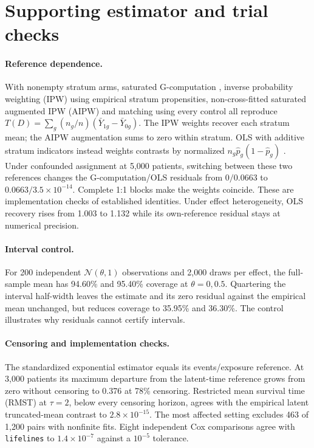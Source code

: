 \section{Supporting estimator and trial checks}
\label{analysis:app:matrix}\label{analysis:sec:matrix}

\paragraph{Reference dependence.}
With nonempty stratum arms, saturated G-computation \citep{robins1986}, inverse
probability weighting (IPW) using empirical stratum propensities,
non-cross-fitted saturated augmented IPW (AIPW) and
matching using every control all reproduce
$T(D)=\sum_g(n_g/n)(\bar Y_{1g}-\bar Y_{0g})$. The IPW weights recover each
stratum mean; the AIPW augmentation sums to zero within stratum. OLS with
additive stratum indicators instead weights contrasts by normalized
$n_g\hat p_g(1-\hat p_g)$ \citep{angrist1998,frisch1933}. Under confounded
assignment at 5{,}000 patients, switching between these two references changes
the G-computation/OLS residuals from $0/0.0663$ to $0.0663/3.5\times10^{-14}$.
Complete 1:1 blocks make the weights coincide. These are implementation checks
of established identities. Under effect heterogeneity, OLS recovery rises
from 1.003 to 1.132 while its own-reference residual stays at numerical precision.

\paragraph{Interval control.}
For 200 independent $\mathcal N(\theta,1)$ observations and 2{,}000 draws per
effect, the full-sample mean has 94.60\% and 95.40\% coverage at
$\theta=0,0.5$. Quartering the interval half-width leaves the estimate and its
zero residual against the empirical mean unchanged, but reduces coverage to
35.95\% and 36.30\%. The control illustrates why residuals cannot certify
intervals.

\paragraph{Censoring and implementation checks.}\label{analysis:app:cox}
The standardized exponential estimator equals its events/exposure reference.
At 3{,}000 patients its maximum departure from the latent-time reference grows
from zero without censoring to 0.376 at 78\% censoring. Restricted mean survival time (RMST) at $\tau=2$, below
every censoring horizon, agrees with the empirical latent truncated-mean
contrast to $2.8\times10^{-15}$. The most affected setting excludes 463 of
1{,}200 pairs with nonfinite fits. Eight independent Cox comparisons agree
with \texttt{lifelines} to $1.4\times10^{-7}$ against a $10^{-5}$ tolerance.

